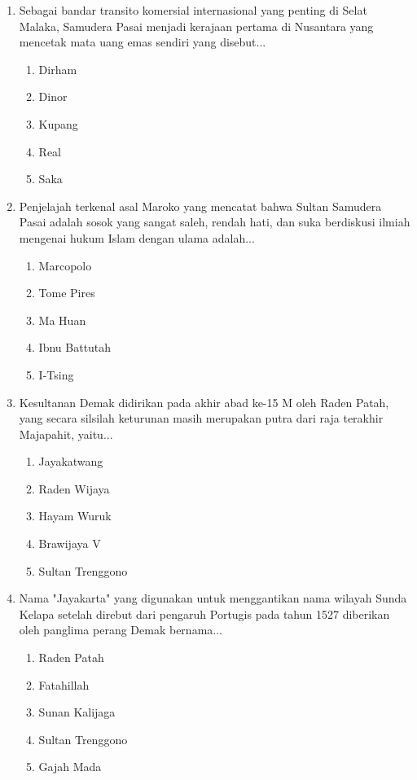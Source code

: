 \documentclass[12pt, a4paper]{article}
\begin{document}
\begin{enumerate}[label=\arabic*.]
    \item Sebagai bandar transito komersial internasional yang penting di Selat Malaka, Samudera Pasai menjadi kerajaan pertama di Nusantara yang mencetak mata uang emas sendiri yang disebut...
    \begin{enumerate}[label=\Alph*.]
        \item Dirham
        \item Dinor
        \item Kupang
        \item Real
        \item Saka
    \end{enumerate}

    \item Penjelajah terkenal asal Maroko yang mencatat bahwa Sultan Samudera Pasai adalah sosok yang sangat saleh, rendah hati, dan suka berdiskusi ilmiah mengenai hukum Islam dengan ulama adalah...
    \begin{enumerate}[label=\Alph*.]
        \item Marcopolo
        \item Tome Pires
        \item Ma Huan
        \item Ibnu Battutah
        \item I-Tsing
    \end{enumerate}

    \item Kesultanan Demak didirikan pada akhir abad ke-15 M oleh Raden Patah, yang secara silsilah keturunan masih merupakan putra dari raja terakhir Majapahit, yaitu...
    \begin{enumerate}[label=\Alph*.]
        \item Jayakatwang
        \item Raden Wijaya
        \item Hayam Wuruk
        \item Brawijaya V
        \item Sultan Trenggono
    \end{enumerate}

    \item Nama "Jayakarta" yang digunakan untuk menggantikan nama wilayah Sunda Kelapa setelah direbut dari pengaruh Portugis pada tahun 1527 diberikan oleh panglima perang Demak bernama...
    \begin{enumerate}[label=\Alph*.]
        \item Raden Patah
        \item Fatahillah
        \item Sunan Kalijaga
        \item Sultan Trenggono
        \item Gajah Mada
    \end{enumerate}


\end{enumerate}
\end{document}
